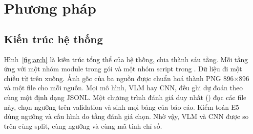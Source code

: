 \clearpage
\section{Phương pháp}
\label{sec:method}

\subsection{Kiến trúc hệ thống}

Hình~\ref{fig:arch} là kiến trúc tổng thể của hệ thống, chia thành sáu tầng. Mỗi tầng ứng với một nhóm module
trong gói  và một nhóm script trong . Dữ liệu đi một chiều từ trên xuống.
Ảnh gốc của ba nguồn được chuẩn hoá thành PNG 896$\times$896 và một file  cho mỗi nguồn.
Mọi mô hình, VLM hay CNN, đều ghi dự đoán theo cùng một định dạng JSONL. Một chương trình đánh giá duy nhất
() đọc các file này, chọn ngưỡng trên validation và sinh mọi bảng của báo cáo. Kiểm toán E5
dùng ngưỡng và cấu hình do tầng đánh giá chọn. Nhờ vậy, VLM và CNN được so trên cùng split, cùng ngưỡng và
cùng mã tính chỉ số.

